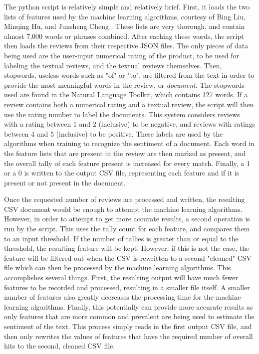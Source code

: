 The python script is relatively simple and relatively brief. First, it loads the two lists of features used by the machine learning algorithms, courtesy of Bing Liu, Minqing Hu, and Junsheng Cheng \cite{Liu:2005:OOA:1060745.1060797}. These lists are very thorough, and contain almost 7,000 words or phrases combined. After caching these words, the script then loads the reviews from their respective JSON files. The only pieces of data being used are the user-input numerical rating of the product, to be used for labeling the textual reviews, and the textual reviews themselves. Then, stopwords, useless words such as "of" or "to", are filtered from the text in order to provide the most meaningful words in the review, or \textit{document}. The stopwords used are found in the Natural Language Toolkit, which contains 127 words. If a review contains both a numerical rating and a textual review, the script will then use the rating number to label the documents. This system considers reviews with a rating between 1 and 2 (inclusive) to be negative, and reviews with ratings between 4 and 5 (inclusive) to be positive. These labels are used by the algorithms when training to recognize the sentiment of a document. Each word in the feature lists that are present in the review are then marked as present, and the overall tally of each feature present is increased for every match. Finally, a 1 or a 0 is written to the output CSV file, representing each feature and if it is present or not present in the document.

Once the requested number of reviews are processed and written, the resulting CSV document would be enough to attempt the machine learning algorithms. However, in order to attempt to get more accurate results, a second operation is run by the script. This uses the tally count for each feature, and compares them to an input threshold. If the number of tallies is greater than or equal to the threshold, the resulting feature will be kept. However, if this is not the case, the feature will be filtered out when the CSV is rewritten to a second "cleaned" CSV file which can then be processed by the machine learning algorithms. This accomplishes several things. First, the resulting output will have much fewer features to be recorded and processed, resulting in a smaller file itself. A smaller number of features also greatly decreases the processing time for the machine learning algorithms. Finally, this potentially can provide more accurate results as only features that are more common and prevalent are being used to estimate the sentiment of the text. This process simply reads in the first output CSV file, and then only rewrites the values of features that have the required number of overall hits to the second, cleaned CSV file.

